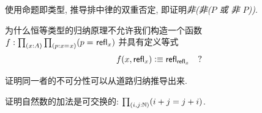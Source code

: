 \begin{ex}\label{ex:not-not-lem}
  使用命题即类型, 推导排中律的双重否定, 即证明\emph{非(非($P$ 或 非 $P$))}.
\end{ex}

\begin{ex}\label{ex:without-K}
  为什么恒等类型的归纳原理不允许我们构造一个函数 $f: \prd{x:A}{p:\id{x}{x}} (\id{p}{\refl{x}})$ 并具有定义等式
  \[ f(x,\mathsf{refl}_{x}) \vcentcolon\equiv \mathsf{refl}_{\mathsf{refl}_{x}} \quad ?\]
\end{ex}

\begin{ex}\label{ex:subtFromPathInd}
  证明同一者的不可分性可以从道路归纳推导出来.  
\end{ex}

\begin{ex}\label{ex:add-nat-commutative}
  证明自然数的加法是可交换的: $\prd{i,j:\nat} (i+j=j+i)$.
\end{ex}


